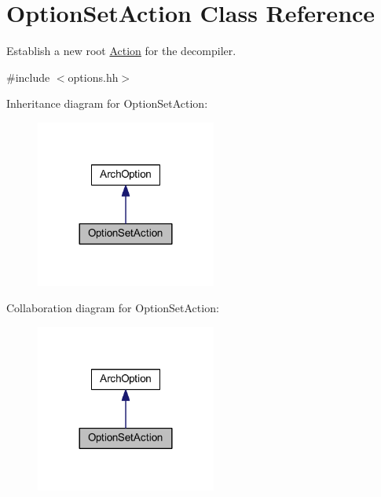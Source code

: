 \hypertarget{class_option_set_action}{}\section{Option\+Set\+Action Class Reference}
\label{class_option_set_action}


Establish a new root \mbox{\hyperlink{class_action}{Action}} for the decompiler.  




{\ttfamily \#include $<$options.\+hh$>$}



Inheritance diagram for Option\+Set\+Action\+:
\nopagebreak
\begin{figure}[H]
\begin{center}
\leavevmode
\includegraphics[width=168pt]{class_option_set_action__inherit__graph}
\end{center}
\end{figure}


Collaboration diagram for Option\+Set\+Action\+:
\nopagebreak
\begin{figure}[H]
\begin{center}
\leavevmode
\includegraphics[width=168pt]{class_option_set_action__coll__graph}
\end{center}
\end{figure}

